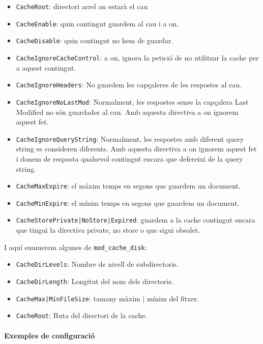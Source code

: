 \documentclass[a4paper, 11pt]{article}
\begin{document}
\begin{itemize}
	\item \verb+CacheRoot+: directori arrel on estarà el cau
	\item \verb+CacheEnable+: quin contingut guardem al cau i a on.
	\item \verb+CacheDisable+: quin contingut no hem de guardar.
	\item \verb+CacheIgnoreCacheControl+: a on, ignora la petició de no utilitzar la cache per a aquest contingut.
	\item \verb+CacheIgnoreHeaders+: No guardem les capçaleres de les respostes al cau.
	\item \verb+CacheIgnoreNoLastMod+: Normalment, les respostes sense la capçalera Last Modified no són guardades al cau. Amb aquesta directiva a on ignorem aquest fet.
	\item \verb+CacheIgnoreQueryString+: Normalment, les respostes amb diferent query string es consideren diferents. Amb aquesta directiva a on ignorem aquest fet i donem de resposta qualsevol contingut encara que defereixi de la query string.
	\item \verb+CacheMaxExpire+: el máxim temps en segons que guardem un document.
	\item \verb+CacheMinExpire+: el mínim temps en segons que guardem un document.
	\item \verb+CacheStorePrivate|NoStore|Expired+: guardem a la cache contingut encara que tingui la directiva private, no store o que sigui obsolet.
\end{itemize}

I aquí enumerem algunes de \verb+mod_cache_disk+:
\begin{itemize}
	\item \verb+CacheDirLevels+: Nombre de nivell de subdirectoris.
	\item \verb+CacheDirLength+: Longitut del nom dels directoris.
	\item \verb+CacheMax|MinFileSize+: tamany màxim | mínim del fitxer.
	\item \verb+CacheRoot+: Ruta del directori de la cache.
\end{itemize}

\paragraph{Exemples de configuració \\}
\end{document}
